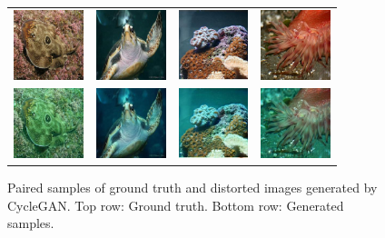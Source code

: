 \documentclass[conference,reqno]{IEEEtran}
\begin{document}
\begin{figure}
\centering
\begin{tabular}{p{1.7cm} p{1.7cm} p{1.7cm} p{1.7cm}}
   
   \includegraphics[width=0.8in]{n01496331_175_B} &
   \includegraphics[width=0.8in]{n01664065_4022_B} &
   \includegraphics[width=0.8in]{n01917289_889_B} &
   \includegraphics[width=0.8in]{n01914609_116_B} \\
   \includegraphics[width=0.8in]{n01496331_175_A} &
   \includegraphics[width=0.8in]{n01664065_4022_A} &
   \includegraphics[width=0.8in]{n01917289_889_A} &
   \includegraphics[width=0.8in]{n01914609_116_A} \\

\end{tabular}
\caption{Paired samples of ground truth and distorted images generated by CycleGAN. Top row: Ground truth.
Bottom row: Generated samples.}
\end{figure}
\end{document}
